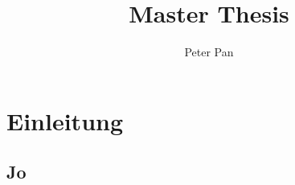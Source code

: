 \documentclass{bht-thesis}
\title{Master Thesis}
\author{Peter Pan}
\begin{document}
	\maketitle
	\tableofcontents
	\chapter{Einleitung}
	\section{Jo}
	\blindtext[4]

	\blindtext[2]

	\blindtext[3]
\end{document}
